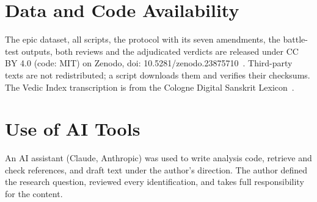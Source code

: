 \documentclass[journal]{IEEEtran}
\begin{document}
\section*{Data and Code Availability}
The epic dataset, all scripts, the protocol with its seven amendments, the battle-test outputs, both reviews and the
adjudicated verdicts are released under CC BY 4.0 (code: MIT) on Zenodo, doi: 10.5281/zenodo.23875710~\cite{zenodo}.
Third-party texts are not redistributed; a script downloads them and verifies their checksums. The Vedic Index transcription is from the Cologne Digital Sanskrit Lexicon~\cite{cdsl}.

\section*{Use of AI Tools}
An AI assistant (Claude, Anthropic) was used to write analysis code, retrieve and check references, and draft text under
the author's direction. The author defined the research question, reviewed every identification, and takes full
responsibility for the content.
\end{document}
